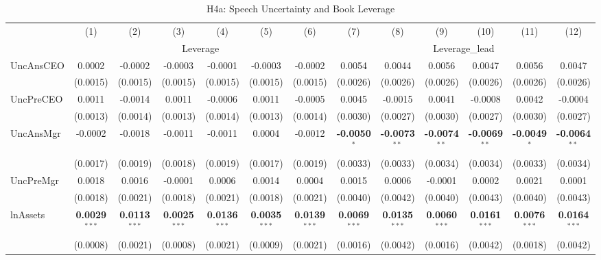 \begin{landscape}
\begin{table}[H]
\setlength{\tabcolsep}{3pt}
\renewcommand{\arraystretch}{0.85}
\centering
\caption{H4a: Speech Uncertainty and Book Leverage}
\label{tab:h4a}
\scriptsize
\begin{tabular}{lcccccccccccc}
\toprule
 & (1) & (2) & (3) & (4) & (5) & (6) & (7) & (8) & (9) & (10) & (11) & (12) \\
 & \multicolumn{6}{c}{Leverage} & \multicolumn{6}{c}{Leverage\_lead} \\
\cmidrule(lr){2-7} \cmidrule(lr){8-13}
\midrule
UncAnsCEO & 0.0002 & -0.0002 & -0.0003 & -0.0001 & -0.0003 & -0.0002 & 0.0054 & 0.0044 & 0.0056 & 0.0047 & 0.0056 & 0.0047 \\
 & (0.0015) & (0.0015) & (0.0015) & (0.0015) & (0.0015) & (0.0015) & (0.0026) & (0.0026) & (0.0026) & (0.0026) & (0.0026) & (0.0026) \\
UncPreCEO & 0.0011 & -0.0014 & 0.0011 & -0.0006 & 0.0011 & -0.0005 & 0.0045 & -0.0015 & 0.0041 & -0.0008 & 0.0042 & -0.0004 \\
 & (0.0013) & (0.0014) & (0.0013) & (0.0014) & (0.0013) & (0.0014) & (0.0030) & (0.0027) & (0.0030) & (0.0027) & (0.0030) & (0.0027) \\
UncAnsMgr & -0.0002 & -0.0018 & -0.0011 & -0.0011 & 0.0004 & -0.0012 & \textbf{-0.0050}$^{*}$ & \textbf{-0.0073}$^{**}$ & \textbf{-0.0074}$^{**}$ & \textbf{-0.0069}$^{**}$ & \textbf{-0.0049}$^{*}$ & \textbf{-0.0064}$^{**}$ \\
 & (0.0017) & (0.0019) & (0.0018) & (0.0019) & (0.0017) & (0.0019) & (0.0033) & (0.0033) & (0.0034) & (0.0034) & (0.0033) & (0.0034) \\
UncPreMgr & 0.0018 & 0.0016 & -0.0001 & 0.0006 & 0.0014 & 0.0004 & 0.0015 & 0.0006 & -0.0001 & 0.0002 & 0.0021 & 0.0001 \\
 & (0.0018) & (0.0021) & (0.0018) & (0.0021) & (0.0018) & (0.0021) & (0.0040) & (0.0042) & (0.0040) & (0.0043) & (0.0040) & (0.0043) \\
\midrule
lnAssets & \textbf{0.0029}$^{***}$ & \textbf{0.0113}$^{***}$ & \textbf{0.0025}$^{***}$ & \textbf{0.0136}$^{***}$ & \textbf{0.0035}$^{***}$ & \textbf{0.0139}$^{***}$ & \textbf{0.0069}$^{***}$ & \textbf{0.0135}$^{***}$ & \textbf{0.0060}$^{***}$ & \textbf{0.0161}$^{***}$ & \textbf{0.0076}$^{***}$ & \textbf{0.0164}$^{***}$ \\
 & (0.0008) & (0.0021) & (0.0008) & (0.0021) & (0.0009) & (0.0021) & (0.0016) & (0.0042) & (0.0016) & (0.0042) & (0.0018) & (0.0042) \\

\end{tabular}
\end{table}
\end{landscape}
